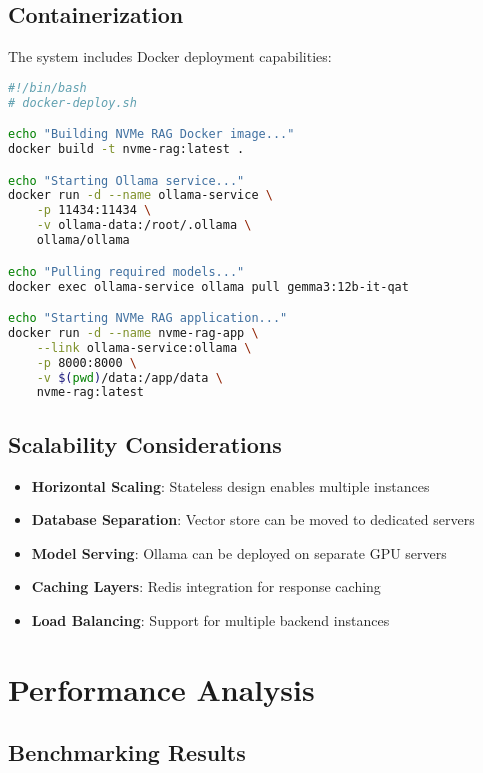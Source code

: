 \documentclass[10pt,a4paper,twocolumn]{article}
\begin{document}
\subsection{Containerization}

The system includes Docker deployment capabilities:

\begin{lstlisting}[language=bash, caption={Docker Deployment Script}]
#!/bin/bash
# docker-deploy.sh

echo "Building NVMe RAG Docker image..."
docker build -t nvme-rag:latest .

echo "Starting Ollama service..."
docker run -d --name ollama-service \
    -p 11434:11434 \
    -v ollama-data:/root/.ollama \
    ollama/ollama

echo "Pulling required models..."
docker exec ollama-service ollama pull gemma3:12b-it-qat

echo "Starting NVMe RAG application..."
docker run -d --name nvme-rag-app \
    --link ollama-service:ollama \
    -p 8000:8000 \
    -v $(pwd)/data:/app/data \
    nvme-rag:latest
\end{lstlisting}

\subsection{Scalability Considerations}

\begin{itemize}
    \item \textbf{Horizontal Scaling}: Stateless design enables multiple instances
    \item \textbf{Database Separation}: Vector store can be moved to dedicated servers
    \item \textbf{Model Serving}: Ollama can be deployed on separate GPU servers
    \item \textbf{Caching Layers}: Redis integration for response caching
    \item \textbf{Load Balancing}: Support for multiple backend instances
\end{itemize}

\section{Performance Analysis}

\subsection{Benchmarking Results}
\end{document}
